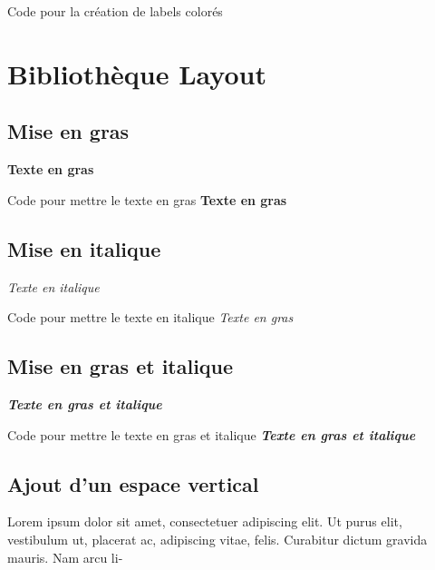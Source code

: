 \documentclass[12pt]{report}
\renewcommand{\bold}[1]{\textbf{#1}}
\newcommand{\italic}[1]{\textit{#1}}
\newcommand{\ib}[1]{\textit{\textbf{#1}}}
\newcommand{\sn}{\vskip 0.5cm}
\begin{document}
\begin{Latex}{Code pour la création de labels colorés}
\end{Latex}\chapter{Bibliothèque Layout}


\section{Mise en gras}

\bold{Texte en gras}
\sn

\begin{Latex}{Code pour mettre le texte en gras}
\bold{Texte en gras}
\end{Latex}

\section{Mise en italique}

\italic{Texte en italique}
\sn
{}
\begin{Latex}{Code pour mettre le texte en italique}
\italic{Texte en gras}
\end{Latex}

\section{Mise en gras et italique}

\ib{Texte en gras et italique}
\sn

\begin{Latex}{Code pour mettre le texte en gras et italique}
\ib{Texte en gras et italique}
\end{Latex}


\section{Ajout d'un espace vertical}

Lorem ipsum dolor sit amet, consectetuer adipiscing elit. Ut purus elit, vestibulum
ut, placerat ac, adipiscing vitae, felis. Curabitur dictum gravida mauris. Nam arcu li- \sn
\end{document}

